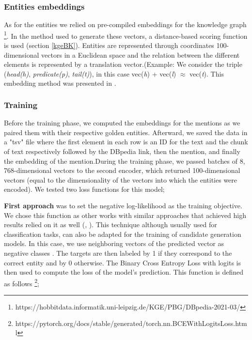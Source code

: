 \subsubsection{Entities embeddings}
As for the entities we relied on pre-compiled embeddings for the knowledge graph \footnote{https://hobbitdata.informatik.uni-leipzig.de/KGE/PBG/DBpedia-2021-03/}. In the method used to generate these vectors, a distance-based scoring function is used (section \ref{kgeBK}). Entities are represented through coordinates 100-dimensional vectors in a Euclidean space and the relation between the different elements is represented by a translation vector.(Example: We consider the triple (\textit{head(h)}, \textit{predicate(p)}, \textit{tail(t)}), in this case vec(\textit{h}) + vec(\textit{l}) $\approx$ vec(\textit{t}). This embedding method was presented in \cite{TransE}.

\subsubsection{Training}
\label{training}
Before the training phase, we computed the embeddings for the mentions as we paired them with their respective golden entities. Afterward, we saved the data in a "tsv" file where the first element in each row is an ID for the text and the chunk of text respectively followed by the DBpedia link, then the mention, and finally the embedding of the mention.\newline During the training phase, we passed batches of 8, 768-dimensional vectors to the second encoder, which returned 100-dimensional vectors (equal to the dimensionality of the vectors into which the entities were encoded).
We tested two loss functions for this model; \newline

\textbf{First approach} was to set the negative log-likelihood as the training objective. We chose this function as other works with similar approaches that achieved high results relied on it as well (\cite{Wu2020}, \cite{logeswaran2019zero}). This technique although usually used for classification tasks, can also be adapted for the training of candidate generation models. In this case, we use neighboring vectors of the predicted vector as negative classes \cite{Sevgili2020}. The targets are then labeled by 1 if they correspond to the correct entity and by 0 otherwise.
The Binary Cross Entropy Loss with logits is then used to compute the loss of the model's prediction. This function is defined as follows \footnote{https://pytorch.org/docs/stable/generated/torch.nn.BCEWithLogitsLoss.html};

